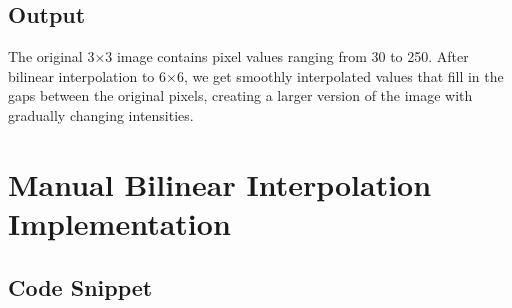 \documentclass[12pt,a4paper]{report}
\begin{document}
\subsection{Output}
The original 3×3 image contains pixel values ranging from 30 to 250. After bilinear interpolation to 6×6, we get smoothly interpolated values that fill in the gaps between the original pixels, creating a larger version of the image with gradually changing intensities.

\section{Manual Bilinear Interpolation Implementation}

\subsection{Code Snippet}
\end{document}
